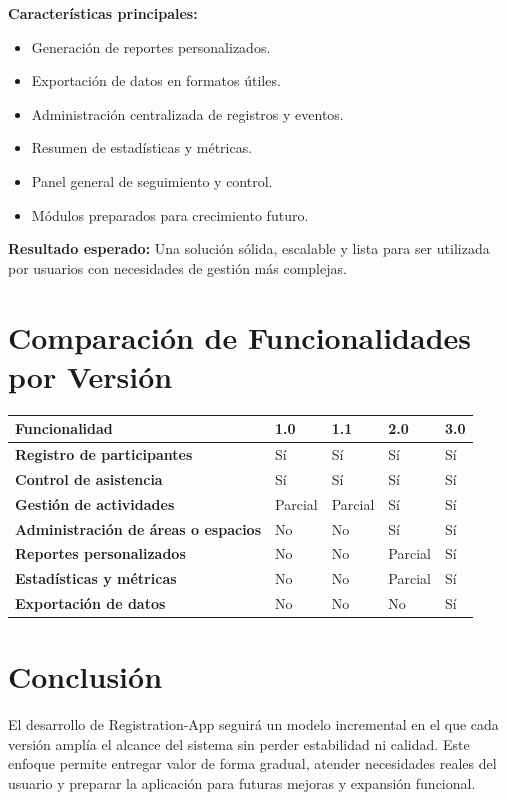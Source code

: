 \documentclass[11pt,a4paper]{article}
\begin{document}
\textbf{Características principales:}
\begin{itemize}[leftmargin=1.5em]
    \item Generación de reportes personalizados.
    \item Exportación de datos en formatos útiles.
    \item Administración centralizada de registros y eventos.
    \item Resumen de estadísticas y métricas.
    \item Panel general de seguimiento y control.
    \item Módulos preparados para crecimiento futuro.
\end{itemize}

\textbf{Resultado esperado:}\newline
Una solución sólida, escalable y lista para ser utilizada por usuarios con necesidades de gestión más complejas.

\section{Comparación de Funcionalidades por Versión}
\begin{table}[H]
\centering
\renewcommand{\arraystretch}{1.4}
\begin{tabularx}{\textwidth}{|>{\bfseries}p{}|X|X|X|X|}
\hline
\rowcolor{lightblue}
\textcolor{navyblue}{\textbf{Funcionalidad}} & \textcolor{navyblue}{\textbf{1.0}} & \textcolor{navyblue}{\textbf{1.1}} & \textcolor{navyblue}{\textbf{2.0}} & \textcolor{navyblue}{\textbf{3.0}} \\
\hline
Registro de participantes & Sí & Sí & Sí & Sí \\
\hline
Control de asistencia & Sí & Sí & Sí & Sí \\
\hline
Gestión de actividades & Parcial & Parcial & Sí & Sí \\
\hline
Administración de áreas o espacios & No & No & Sí & Sí \\
\hline
Reportes personalizados & No & No & Parcial & Sí \\
\hline
Estadísticas y métricas & No & No & Parcial & Sí \\
\hline
Exportación de datos & No & No & No & Sí \\
\hline
\end{tabularx}
\end{table}

\section{Conclusión}
El desarrollo de Registration-App seguirá un modelo incremental en el que cada versión amplía el alcance del sistema sin perder estabilidad ni calidad. Este enfoque permite entregar valor de forma gradual, atender necesidades reales del usuario y preparar la aplicación para futuras mejoras y expansión funcional.
\end{document}

